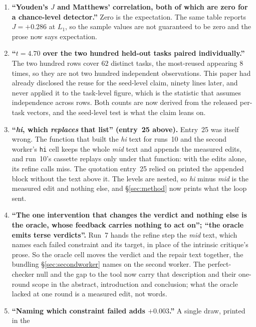 \documentclass[11pt]{article}
\begin{document}
\begin{enumerate}
    counts whitespace-delimited words with edge punctuation stripped, which is what its own
    docstring says. The residual is a word-counting failure.
  \item \textbf{``Youden's $J$ and Matthews' correlation, both of which are zero for a
    chance-level detector.''} Zero is the expectation. The same table reports $J = +0.286$ at
    $L_1$, so the sample values are not guaranteed to be zero and the prose now says expectation.
  \item \textbf{``$t = 4.70$ over the two hundred held-out tasks paired individually.''} The two
    hundred rows cover $62$ distinct tasks, the most-reused appearing $8$ times, so they are not
    two hundred independent observations. This paper had already disclosed the reuse for the
    seed-level claim, ninety lines later, and never applied it to the task-level figure, which is
    the statistic that assumes independence across rows. Both counts are now derived from the
    released per-task vectors, and the seed-level test is what the claim leans on.
  \item \textbf{``\emph{hi}, which \emph{replaces} that list'' (entry~25 above).} Entry~25 was itself
    wrong. The function that built the \emph{hi} text for runs~10 and the second worker's
    \texttt{hi} cell keeps the whole \emph{mid} text and appends the measured edits, and run~10's
    cassette replays only under that function: with the edits alone, its refine calls miss.
    The quotation entry~25 relied on printed the appended block without the text above it. The
    levels are nested, so \emph{hi} minus \emph{mid} is the measured edit and nothing else, and
    \S\ref{sec:method} now prints what the loop sent.
  \item \textbf{``The one intervention that changes the verdict and nothing else is the oracle,
    whose feedback carries nothing to act on''; ``the oracle emits terse verdicts''.} Run~7 hands
    the refine step the \emph{mid} text, which names each failed constraint and its target, in
    place of the intrinsic critique's prose. So the oracle cell moves the verdict and the repair
    text together, the bundling \S\ref{sec:secondworker} names on the second worker.
    The perfect-checker null and the gap to the tool now carry that description and their one-round
    scope in the abstract, introduction and conclusion; what the oracle lacked at one round is a
    measured edit, not words.
  \item \textbf{``Naming which constraint failed adds $+0.003$.''} A single draw, printed in the

\end{enumerate}
\end{document}
